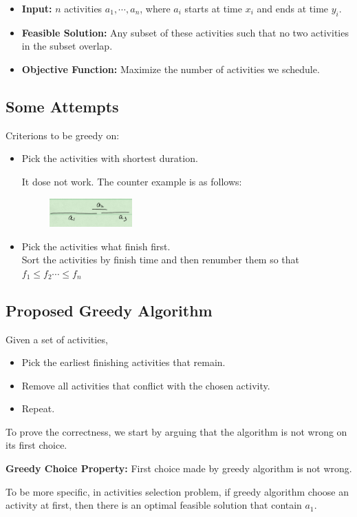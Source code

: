 \begin{itemize}
 \item \textbf{Input:} $n$ activities $a_1, \cdots, a_n$, where $a_i$ starts at 
time $x_i$ and ends at time $y_i$.
\item \textbf{Feasible Solution:} Any subset of these activities such that no 
two activities in the subset overlap. 
\item \textbf{Objective Function:} Maximize the number of activities we 
schedule.
\end{itemize}

\subsection{Some Attempts}
Criterions to be greedy on:
\begin{itemize}
	\item Pick the activities with shortest duration. 
	
	It dose not work. The counter example is as follows:
    \begin{figure}[H]
    \centering
    \includegraphics[width=0.3\textwidth]{1st-attempt.png}
    \end{figure}
	\item Pick the activities what finish first.\\
        Sort the activities by finish time and then renumber them so that $f_1 
\le f_2 \cdots \le f_n$
\end{itemize}
\subsection{Proposed Greedy Algorithm}
Given a set of activities, 
\begin{itemize}
	\item Pick the earliest finishing activities that remain.
	\item Remove all activities that conflict with the chosen activity.
	\item Repeat.
\end{itemize}

To prove the correctness, we start by arguing that the algorithm 
is not wrong on its first choice.

\begin{claim}
	\textbf{Greedy Choice Property:} First choice made by greedy algorithm is 
not wrong.
\end{claim}
To be more specific, in activities selection problem, if greedy algorithm 
choose an activity at first, then there is an optimal feasible solution that 
contain $a_1$.


